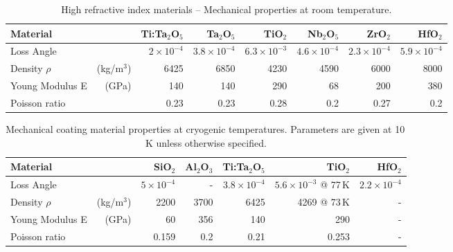 \begin{table}[h!]
\begin{center}
\begin{tabular}{|l r||r|r|r|r|r|r|}
  \hline
    {\large\strut} Material  & & Ti:Ta$_2$O$_5$ & Ta$_2$O$_5$ & TiO$_2$ & Nb$_2$O$_5$ & ZrO$_2$ & HfO$_2$ \\
  \hline
  \hline
   {\large\strut} Loss Angle & &  $2\times 10^{-4}$ & $3.8\times 10^{-4}$  & $6.3\times 10^{-3}$ & $4.6\times 10^{-4}$ & $2.3\times 10^{-4}$ & $5.9\times 10^{-4}$  \\
   {\large\strut} Density $\rho$ & (kg/m$^3$) & 6425 & 6850 & 4230 & 4590 & 6000 & 8000 \\
   {\large\strut} Young Modulus E & (GPa) & 140 & 140 & 290 & 68 & 200 & 380 \\
   {\large\strut} Poisson ratio & & 0.23 & 0.23 & 0.28 & 0.2 & 0.27 & 0.2 \\
  \hline
\end{tabular}
\caption{High refractive index materials -- Mechanical properties at room temperature.}
\end{center}
\label{tab:Mech_CoatHighRef_Param}
\end{table}

\begin{table}[h!]
\begin{center}
\begin{tabular}{|l r||r|r|r|r|r|}
  \hline
    {\large\strut} Material  & & SiO$_2$ & Al$_2$O$_3$ &  Ti:Ta$_2$O$_5$ & TiO$_2$ & HfO$_2$ \\
  \hline
  \hline
   {\large\strut} Loss Angle & & $5\times10^{-4}$ & - & $3.8\times 10^{-4}$ & $5.6\times 10^{-3}$ @ 77\,K & $2.2\times 10^{-4}$  \\
   {\large\strut} Density $\rho$ & (kg/m$^3$) & 2200 & 3700 & 6425 & 4269 @ 73\,K & - \\
   {\large\strut} Young Modulus E & (GPa) &  60 & 356 & 140 & 290 & - \\
   {\large\strut} Poisson ratio & & 0.159 & 0.2 & 0.21 & 0.253 & - \\
  \hline
\end{tabular}
\caption{Mechanical coating material properties at cryogenic temperatures. Parameters are given at 10\,K unless otherwise specified.}
\end{center}
\label{tab:Mech_Coat_Param_cryo}
\end{table}


